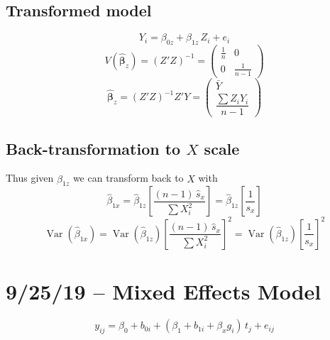 \documentclass[11pt]{article}
\newcommand{\Var}{\operatorname{Var}}
\begin{document}
\subsection*{Transformed model}
\begin{equation}
  Y_i = \beta_{0z} + \beta_{1z}\,Z_i + e_i
\end{equation}
\begin{equation}
  V(\hat{\bm{\beta}}_z) = (Z'Z)^{-1}
  = \begin{pmatrix}
      \frac{1}{n} & 0 \\
      0 & \frac{1}{n-1}
    \end{pmatrix}
\end{equation}
\begin{equation}
  \hat{\bm{\beta}}_z = (Z'Z)^{-1}Z'Y
  = \begin{pmatrix}
      \bar{Y} \\[4pt]
      \dfrac{\sum Z_i Y_i}{n-1}
    \end{pmatrix}
\end{equation}

\subsection*{Back-transformation to $X$ scale}

Thus given $\hat{\beta}_{1z}$ we can transform back
to $X$ with
\begin{equation}
  \hat{\beta}_{1x}
  = \hat{\beta}_{1z}
    \left[\frac{(n-1)\,\hat{s}_x}{\sum X_i^2}\right]
  = \hat{\beta}_{1z}
    \left[\frac{1}{s_x}\right]
\end{equation}
\begin{equation}
  \Var(\hat{\beta}_{1x})
  = \Var(\hat{\beta}_{1z})
    \left[\frac{(n-1)\,\hat{s}_x}{\sum X_i^2}\right]^2
  = \Var(\hat{\beta}_{1z})
    \left[\frac{1}{s_x}\right]^2
\end{equation}


\newpage
\section{9/25/19 -- Mixed Effects Model}

\begin{equation}
  y_{ij} = \beta_0 + b_{0i}
    + (\beta_1 + b_{1i} + \beta_x g_i)\,t_j + e_{ij}
\end{equation}
\end{document}
